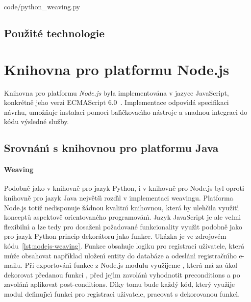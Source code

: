 
{code/python_weaving.py}

\paragraph{}

\subsection{Použité technologie}

\section{Knihovna pro platformu Node.js}

Knihovna pro platformu \textit{Node.js} byla implementována
v jazyce JavaScript, konkrétně jeho verzi
ECMAScript 6.0~\cite{ecma60}.
Implementace odpov\'{\i}dá specifikaci návrhu, umožňuje
instalaci pomoc\'{\i} bal\'{\i}čkovac\'{\i}ho nástroje a snadnou
integraci do kódu v\'ysledné služby.

\subsection{Srovnán\'{\i} s knihovnou pro platformu Java}

\paragraph{Weaving} Podobně jako v knihovně pro jazyk Python,
i v knihovně pro Node.js byl oproti knihovně pro jazyk Java
největš\'{\i} rozd\'{\i}l v implementaci weavingu. Platforma Node.js
totiž nedisponuje žádnou kvalitn\'{\i} knihovnou, která by ulehčila
využit\'{\i} konceptů aspektově orientovaného programován\'{\i}.
Jazyk JavaScript je ale velmi flexibiln\'{\i} a lze
tedy pro dosažen\'{\i} požadované funkcionality využ\'{\i}t
podobně jako pro jazyk Python princip dekorátoru jako funkce.
Ukázka je ve zdrojovém kódu~\ref{lst:nodejs-weaving}.
Funkce  obsahuje logiku pro registraci uživatele,
která může obsahovat např\'{\i}klad uložen\'{\i} entity do databáze a odeslán\'{\i}
registračn\'{\i}ho e-mailu. Při exportován\'{\i} funkce z Node.js modulu
využijeme , která má za úkol dekorovat
předanou funkci , před jej\'{\i}m zavolán\'{\i} vyhodnotit
preconditions a po zavolán\'{\i} aplikovat post-conditions.
D\'{\i}ky tomu bude každ\'y kód, kter\'y využije modul definuj\'{\i}c\'{\i} funkci
pro registraci uživatele, pracovat s dekorovanou funkc\'{\i}.

